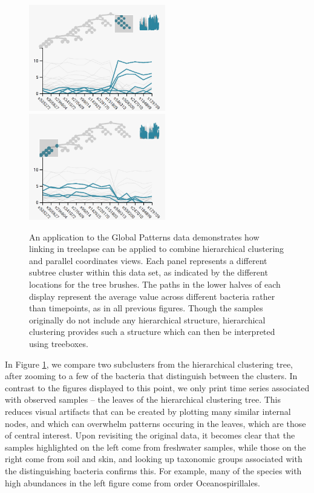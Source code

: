 \begin{figure}
  {
    \centering
    \includegraphics[width=225px]{figure/treelapse/gp_cluster1}
    \includegraphics[width=225px]{figure/treelapse/gp_cluster2}
}

\caption{An application to the Global Patterns data demonstrates how linking in
  treelapse can be applied to combine hierarchical clustering and parallel
  coordinates views. Each panel represents a different subtree cluster within
  this data set, as indicated by the different locations for the tree brushes.
  The paths in the lower halves of each display represent the average value
  across different bacteria rather than timepoints, as in all previous figures.
  Though the samples originally do not include any hierarchical structure,
  hierarchical clustering provides such a structure which can then be
  interpreted using treeboxes.}\label{fig:gptimebox}
\end{figure}

In Figure \ref{fig:gptimebox}, we compare two subclusters from the
hierarchical clustering tree, after zooming to a few of the bacteria
that distinguish between the clusters. In contrast to the figures displayed to
this point, we only print time series associated with observed samples -- the
leaves of the hierarchical clustering tree. This reduces visual artifacts that
can be created by plotting many similar internal nodes, and which can overwhelm
patterns occuring in the leaves, which are those of central interest. Upon
revisiting the original data, it becomes clear that the samples highlighted on
the left come from freshwater samples, while those on the right come from soil
and skin, and looking up taxonomic groups associated with the distinguishing
bacteria confirms this. For example, many of the species with high
abundances in the left figure come from order Oceanospirillales.

